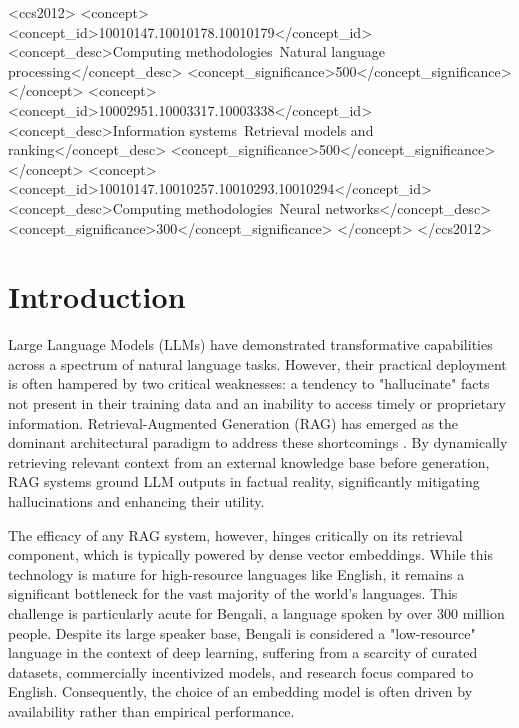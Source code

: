 \documentclass[acmsmall,screen,review]{acmart}
\begin{document}
\begin{CCSXML}
<ccs2012>
   <concept>
       <concept_id>10010147.10010178.10010179</concept_id>
       <concept_desc>Computing methodologies~Natural language processing</concept_desc>
       <concept_significance>500</concept_significance>
   </concept>
   <concept>
       <concept_id>10002951.10003317.10003338</concept_id>
       <concept_desc>Information systems~Retrieval models and ranking</concept_desc>
       <concept_significance>500</concept_significance>
   </concept>
   <concept>
       <concept_id>10010147.10010257.10010293.10010294</concept_id>
       <concept_desc>Computing methodologies~Neural networks</concept_desc>
       <concept_significance>300</concept_significance>
   </concept>
 </ccs2012>
\end{CCSXML}



\maketitle


\section{Introduction}

Large Language Models (LLMs) have demonstrated transformative capabilities across a spectrum of natural language tasks. However, their practical deployment is often hampered by two critical weaknesses: a tendency to "hallucinate" facts not present in their training data and an inability to access timely or proprietary information. Retrieval-Augmented Generation (RAG) has emerged as the dominant architectural paradigm to address these shortcomings \cite{lewis2020retrieval, gao2023survey}. By dynamically retrieving relevant context from an external knowledge base before generation, RAG systems ground LLM outputs in factual reality, significantly mitigating hallucinations and enhancing their utility.

The efficacy of any RAG system, however, hinges critically on its retrieval component, which is typically powered by dense vector embeddings. While this technology is mature for high-resource languages like English, it remains a significant bottleneck for the vast majority of the world's languages. This challenge is particularly acute for Bengali, a language spoken by over 300 million people. Despite its large speaker base, Bengali is considered a "low-resource" language in the context of deep learning, suffering from a scarcity of curated datasets, commercially incentivized models, and research focus compared to English. Consequently, the choice of an embedding model is often driven by availability rather than empirical performance.
\end{document}
